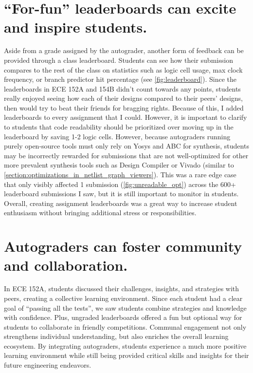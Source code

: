 \section{\enquote{For-fun} leaderboards can excite and inspire students.}
\label{section:leaderboard}




Aside from a grade assigned by the autograder, another form of feedback can be provided through a class leaderboard. Students can see how their submission compares to the rest of the class on statistics such as logic cell usage, max clock frequency, or branch predictor hit percentage (see \autoref{fig:leaderboard}). Since the leaderboards in ECE 152A and 154B didn't count towards any points, students really enjoyed seeing how each of their designs compared to their peers' designs, then would try to beat their friends for bragging rights. Because of this, I added leaderboards to every assignment that I could. However, it is important to clarify to students that code readability should be prioritized over moving up in the leaderboard by saving 1-2 logic cells. However, because autograders running purely open-source tools must only rely on Yosys and ABC for synthesis, students may be incorrectly rewarded for submissions that are not well-optimized for other more prevalent synthesis tools such as Design Compiler or Vivado (similar to \autoref{section:optimizations_in_netlist_graph_viewers}). This was a rare edge case that only visibly affected 1 submission (\autoref{fig:unreadable_opt}) across the 600+ leaderboard submissions I saw, but it is still important to monitor in students. Overall, creating assignment leaderboards was a great way to increase student enthusiasm without bringing additional stress or responsibilities.

\section{Autograders can foster community and collaboration.}

In ECE 152A, students discussed their challenges, insights, and strategies with peers, creating a collective learning environment. Since each student had a clear goal of \enquote{passing all the tests}, we saw students combine strategies and knowledge with confidence. Plus, ungraded leaderboards offered a fun but optional way for students to collaborate in friendly competitions. Communal engagement not only strengthens individual understanding, but also enriches the overall learning ecosystem. By integrating autograders, students experience a much more positive learning environment while still being provided critical skills and insights for their future engineering endeavors.
